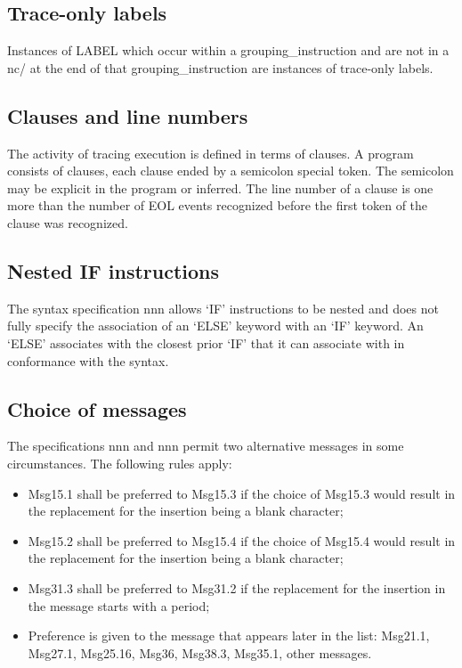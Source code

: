 \subsection{Trace-only labels}\label{trace-only-labels}

Instances of LABEL which occur within a grouping\_instruction and are
not in a nc/ at the end of that grouping\_instruction are instances of
trace-only labels.

\subsection{Clauses and line numbers}\label{clauses-and-line-numbers}

The activity of tracing execution is defined in terms of clauses. A
program consists of clauses, each clause ended by a semicolon special
token. The semicolon may be explicit in the program or inferred. The
line number of a clause is one more than the number of EOL events
recognized before the first token of the clause was recognized.

\subsection{Nested IF instructions}\label{nested-if-instructions}

The syntax specification nnn allows `IF' instructions to be nested and
does not fully specify the association of an `ELSE' keyword with an `IF'
keyword. An `ELSE' associates with the closest prior `IF' that it can
associate with in conformance with the syntax.

\subsection{Choice of messages}\label{choice-of-messages}

The specifications nnn and nnn permit two alternative messages in some
circumstances. The following rules apply:

\begin{itemize}
\item
  Msg15.1 shall be preferred to Msg15.3 if the choice of Msg15.3 would
  result in the replacement for the insertion being a blank character;
\item
  Msg15.2 shall be preferred to Msg15.4 if the choice of Msg15.4 would
  result in the replacement for the insertion being a blank character;
\item
  Msg31.3 shall be preferred to Msg31.2 if the replacement for the
  insertion in the message starts with a period;
\item
  Preference is given to the message that appears later in the list:
  Msg21.1, Msg27.1, Msg25.16, Msg36, Msg38.3, Msg35.1, other messages.
\end{itemize}

